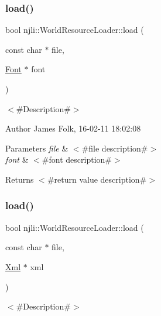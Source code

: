 \subsubsection{\texorpdfstring{load()}{load()}\hspace{0.1cm}{\footnotesize\ttfamily [7/13]}}
{\footnotesize\ttfamily bool njli\+::\+World\+Resource\+Loader\+::load (\begin{DoxyParamCaption}\item[{const char $\ast$}]{file,  }\item[{\mbox{\hyperlink{classnjli_1_1_font}{Font}} $\ast$}]{font }\end{DoxyParamCaption})}



$<$\#\+Description\#$>$ 

\begin{DoxyAuthor}{Author}
James Folk, 16-\/02-\/11 18\+:02\+:08
\end{DoxyAuthor}

\begin{DoxyParams}{Parameters}
{\em file} & $<$\#file description\#$>$ \\
\hline
{\em font} & $<$\#font description\#$>$\\
\hline
\end{DoxyParams}
\begin{DoxyReturn}{Returns}
$<$\#return value description\#$>$ 
\end{DoxyReturn}
\mbox{\label{classnjli_1_1_world_resource_loader_a5841d6c7619db6821d2bad70dc34bd2b}} 
\subsubsection{\texorpdfstring{load()}{load()}\hspace{0.1cm}{\footnotesize\ttfamily [8/13]}}
{\footnotesize\ttfamily bool njli\+::\+World\+Resource\+Loader\+::load (\begin{DoxyParamCaption}\item[{const char $\ast$}]{file,  }\item[{\mbox{\hyperlink{classnjli_1_1_xml}{Xml}} $\ast$}]{xml }\end{DoxyParamCaption})}



$<$\#\+Description\#$>$ 

